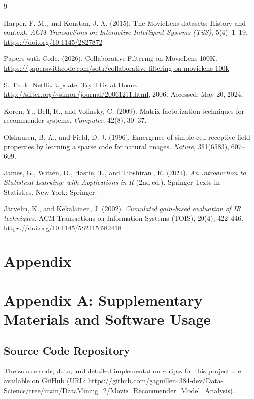 \documentclass[conference]{IEEEtran}
\begin{document}
\begin{thebibliography}{9} %
	
Harper, F. M., and Konstan, J. A. (2015). 
\newblock The MovieLens datasets: History and context. 
\newblock \textit{ACM Transactions on Interactive Intelligent Systems (TiiS)}, 5(4), 1--19.
\newblock \url{https://doi.org/10.1145/2827872}

Papers with Code. (2026).
\newblock Collaborative Filtering on MovieLens 100K.
\newblock \url{https://paperswithcode.com/sota/collaborative-filtering-on-movielens-100k}

S.~Funk.
\newblock Netflix Update: Try This at Home.
\newblock \url{http://sifter.org/~simon/journal/20061211.html}, 2006.
\newblock Accessed: May 20, 2024.

Koren, Y., Bell, R., and Volinsky, C. (2009). 
\newblock Matrix factorization techniques for recommender systems. 
\newblock \textit{Computer}, 42(8), 30--37.

Olshausen, B. A., and Field, D. J. (1996). 
\newblock Emergence of simple-cell receptive field properties by learning a sparse code for natural images. 
\newblock \textit{Nature}, 381(6583), 607--609.

James, G., Witten, D., Hastie, T., and Tibshirani, R. (2021). 
\textit{An Introduction to Statistical Learning: with Applications in R} (2nd ed.). 
Springer Texts in Statistics. New York: Springer.

Järvelin, K., and Kekäläinen, J. (2002). 
\textit{Cumulated gain-based evaluation of IR techniques}. 
ACM Transactions on Information Systems (TOIS), 20(4), 422–446. 
https://doi.org/10.1145/582415.582418

\section*{\textbf{Appendix}}

\section*{Appendix A: Supplementary Materials and Software Usage}
\subsection*{Source Code Repository \label{app:code}}
The source code, data, and detailed implementation scripts for this project are available on GitHub (URL: \url{https://github.com/gaguillen4384-dev/Data-Science/tree/main/DataMining_2/Movie_Recommender_Model_Analysis}).


\end{thebibliography}
\end{document}

